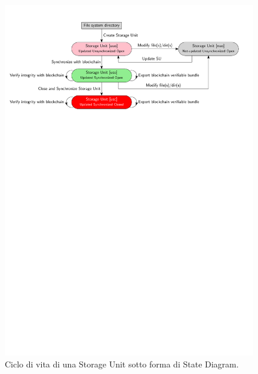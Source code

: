 \begin{figure}[H]
    \centering
    \includegraphics[width=0.98\textwidth]{Figures/stateDiag2}
    \caption{\small{
    Ciclo di vita di una Storage Unit sotto forma di State Diagram.
    } %
    } %
    \label{fi:stateDiag}
\end{figure}

